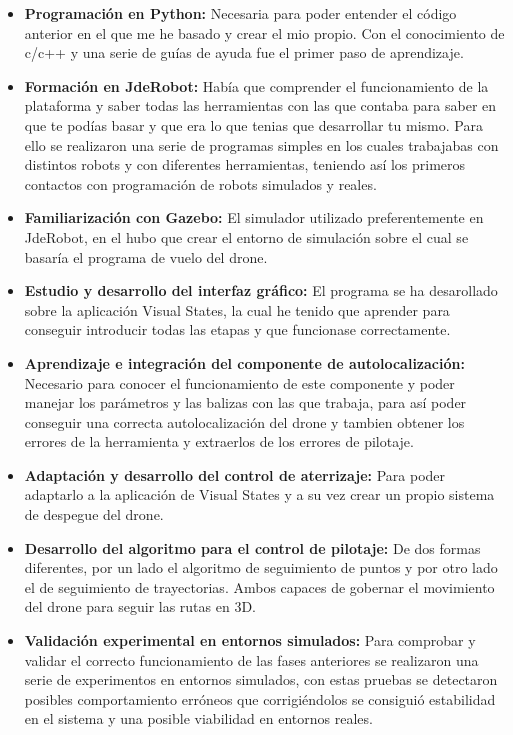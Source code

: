 \begin{itemize}
	\item \textbf{Programación en Python:} Necesaria para poder entender el código anterior en el que me he basado y crear el mio propio. Con el conocimiento de c/c++ y una serie de guías de ayuda fue el  primer paso de aprendizaje.
	\item \textbf{Formación en JdeRobot:} Había que comprender el funcionamiento de la plataforma y saber todas las herramientas con las que contaba para saber en que te podías basar y que era lo que tenias que desarrollar tu mismo. Para ello se realizaron una serie de programas simples en los cuales trabajabas con distintos robots y con diferentes herramientas, teniendo así los primeros contactos con programación de robots simulados y reales.
	\item \textbf{Familiarización con Gazebo:} El simulador utilizado preferentemente en JdeRobot, en el hubo que crear el entorno de simulación sobre el cual se basaría el programa de vuelo del drone.	
	\item \textbf{Estudio y desarrollo del interfaz gráfico:} El programa se ha desarollado sobre la aplicación Visual States, la cual he tenido que aprender para conseguir introducir todas las etapas y que funcionase correctamente.
	\item \textbf{Aprendizaje e integración del componente de autolocalización:} Necesario para conocer el funcionamiento de este componente y poder manejar los parámetros y las balizas con las que trabaja, para así poder conseguir una correcta autolocalización del drone y tambien obtener los errores de la herramienta y extraerlos de los errores de pilotaje.
	\item \textbf{Adaptación y desarrollo del control de aterrizaje:} Para poder adaptarlo a la aplicación de Visual States y a su vez crear un propio sistema de despegue del drone.
	\item \textbf{Desarrollo del algoritmo para el control de pilotaje:} De dos formas diferentes, por un lado el algoritmo de seguimiento de puntos y por otro lado el de seguimiento de trayectorias. Ambos capaces de gobernar el movimiento del drone para seguir las rutas en 3D. 
	\item \textbf{Validación experimental en entornos simulados:} Para comprobar y validar el correcto funcionamiento de las fases anteriores se realizaron una serie de experimentos en entornos simulados, con estas pruebas se detectaron posibles comportamiento erróneos que corrigiéndolos se consiguió estabilidad en el sistema y una posible viabilidad en entornos reales.   
\end{itemize}
